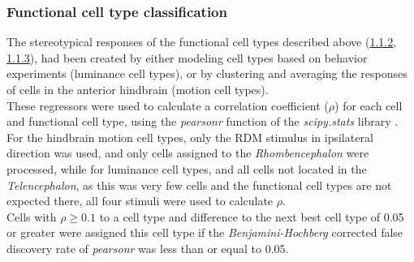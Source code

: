 \documentclass[12pt, a4paper, oneside]{article}
\begin{document}
\subsubsection{Functional cell type classification}
The stereotypical responses of the functional cell types described above (\hyperref[sec:omr]{1.1.2}, \hyperref[sec:phototaxis]{1.1.3}), had been created by either modeling cell types based on behavior experiments (luminance cell types), or by clustering and averaging the responses of cells in the anterior hindbrain (motion cell types).\\
These regressors were used to calculate a correlation coefficient ($\rho$) for each cell and functional cell type, using the \textit{pearsonr} function of the \textit{scipy.stats} library \parencite{virtanenSciPy10Fundamental2020}. For the hindbrain motion cell types, only the RDM stimulus in ipsilateral direction was used, and only cells assigned to the \textit{Rhombencephalon} were processed, 
while for luminance cell types, and all cells not located in the \textit{Telencephalon}, as this was very few cells and the functional cell types are not expected there, all four stimuli were used to calculate $\rho$.\\
Cells with $\rho \geq 0.1$ to a cell type and difference to the next best cell type of 0.05 or greater were assigned this cell type if the \textit{Benjamini-Hochberg} \parencite{benjaminiControllingFalseDiscovery1995} corrected false discovery rate of \textit{pearsonr} was less than or equal to 0.05.\\
\end{document}
